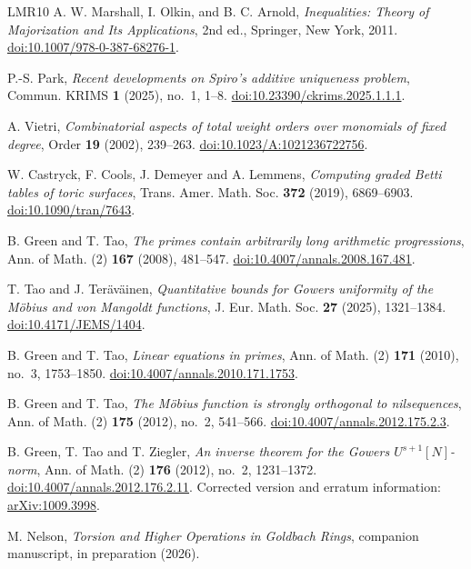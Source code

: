 \begin{thebibliography}{LMR10}
A. W. Marshall, I. Olkin, and B. C. Arnold,
\emph{Inequalities: Theory of Majorization and Its Applications},
2nd ed., Springer, New York, 2011.
\href{https://doi.org/10.1007/978-0-387-68276-1}{doi:10.1007/978-0-387-68276-1}.

P.-S. Park,
\emph{Recent developments on Spiro's additive uniqueness problem},
Commun. KRIMS \textbf{1} (2025), no.~1, 1--8.
\href{https://doi.org/10.23390/ckrims.2025.1.1.1}{doi:10.23390/ckrims.2025.1.1.1}.

A. Vietri,
\emph{Combinatorial aspects of total weight orders over monomials of fixed degree},
Order \textbf{19} (2002), 239--263.
\href{https://doi.org/10.1023/A:1021236722756}{doi:10.1023/A:1021236722756}.

W. Castryck, F. Cools, J. Demeyer and A. Lemmens,
\emph{Computing graded Betti tables of toric surfaces},
Trans. Amer. Math. Soc. \textbf{372} (2019), 6869--6903.
\href{https://doi.org/10.1090/tran/7643}{doi:10.1090/tran/7643}.

B. Green and T. Tao, \emph{The primes contain arbitrarily long
arithmetic progressions}, Ann. of Math. (2) \textbf{167} (2008), 481--547.
\href{https://doi.org/10.4007/annals.2008.167.481}{doi:10.4007/annals.2008.167.481}.

T. Tao and J. Ter\"av\"ainen, \emph{Quantitative bounds for Gowers
uniformity of the M\"obius and von Mangoldt functions},
J. Eur. Math. Soc. \textbf{27} (2025), 1321--1384.
\href{https://doi.org/10.4171/JEMS/1404}{doi:10.4171/JEMS/1404}.

B. Green and T. Tao, \emph{Linear equations in primes},
Ann. of Math. (2) \textbf{171} (2010), no.~3, 1753--1850.
\href{https://doi.org/10.4007/annals.2010.171.1753}{doi:10.4007/annals.2010.171.1753}.

B. Green and T. Tao, \emph{The M\"obius function is strongly orthogonal
to nilsequences}, Ann. of Math. (2) \textbf{175} (2012), no.~2, 541--566.
\href{https://doi.org/10.4007/annals.2012.175.2.3}{doi:10.4007/annals.2012.175.2.3}.

B. Green, T. Tao and T. Ziegler, \emph{An inverse theorem for the
Gowers $U^{s+1}[N]$-norm}, Ann. of Math. (2) \textbf{176} (2012),
no.~2, 1231--1372.
\href{https://doi.org/10.4007/annals.2012.176.2.11}{doi:10.4007/annals.2012.176.2.11}.
Corrected version and erratum information:
\href{https://arxiv.org/abs/1009.3998}{arXiv:1009.3998}.

M. Nelson,
\emph{Torsion and Higher Operations in Goldbach Rings},
companion manuscript, in preparation (2026).

\end{thebibliography}
